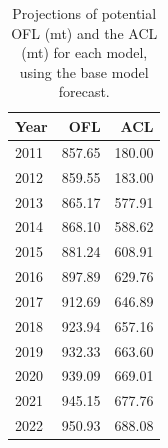 \documentclass[12pt,]{article}
\begin{document}
\begin{table}[ht]
\centering
\caption{Projections of potential OFL (mt) and the ACL (mt) for each model, using the base model forecast.} 
\label{tab:OFL_projection}
\begin{tabular}{lrr}
  \hline
Year & OFL & ACL \\ 
  \hline
2011 & 857.65 & 180.00 \\ 
  2012 & 859.55 & 183.00 \\ 
  2013 & 865.17 & 577.91 \\ 
  2014 & 868.10 & 588.62 \\ 
  2015 & 881.24 & 608.91 \\ 
  2016 & 897.89 & 629.76 \\ 
  2017 & 912.69 & 646.89 \\ 
  2018 & 923.94 & 657.16 \\ 
  2019 & 932.33 & 663.60 \\ 
  2020 & 939.09 & 669.01 \\ 
  2021 & 945.15 & 677.76 \\ 
  2022 & 950.93 & 688.08 \\ 
   \hline
\end{tabular}
\end{table}\begin{table}[ht]
\centering
\caption{Summary of 10-year 
                                             projections beginning in 2013 
                                             for alternate states of nature based on 
                                             an axis of uncertainty for the Base model.  Columns range over low, mid, and high
                                             states of nature, and rows range over different 
                                             assumptions of catch levels. An entry of "--" 
                                             indicates that the stock is driven to very low 
                                             abundance under the particular scenario.} 
\label{tab:Decision_table_mod1}
\end{table}
\end{document}
